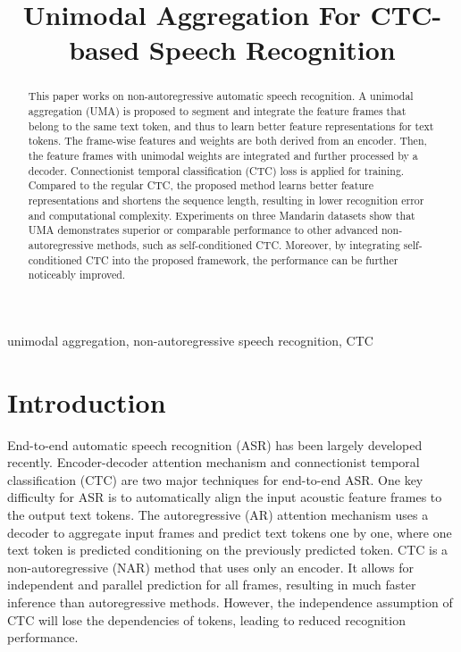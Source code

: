 \documentclass{article}
\title{Unimodal Aggregation For CTC-based Speech Recognition}
\begin{document}
\maketitle
\begin{abstract}
This paper works on non-autoregressive automatic speech recognition. A unimodal aggregation (UMA) is proposed to segment and integrate the feature frames that belong to the same text token, and thus to learn better feature representations for text tokens. The frame-wise features and weights are both derived from an encoder. Then, the feature frames with unimodal weights are integrated and further processed by a decoder. Connectionist temporal classification (CTC) loss is applied for training. Compared to the regular CTC, the proposed method learns better feature representations and shortens the sequence length, resulting in lower recognition error and computational complexity. Experiments on three Mandarin datasets show that UMA demonstrates superior or comparable performance to other advanced non-autoregressive methods, such as self-conditioned CTC. Moreover, by integrating self-conditioned CTC into the proposed framework, the performance can be further noticeably improved. 
\end{abstract}
\begin{keywords}
unimodal aggregation, non-autoregressive speech recognition, CTC 
\end{keywords}


\section{Introduction}
\label{sec:intro}
End-to-end automatic speech recognition (ASR) has been largely developed recently.  Encoder-decoder attention mechanism \cite{chan2016listen} and connectionist temporal classification (CTC) \cite{graves2014towards} are two major techniques for end-to-end ASR. One key difficulty for ASR is to automatically align the input acoustic feature frames to the output text tokens. The autoregressive (AR) attention mechanism uses a decoder to aggregate input frames and predict text tokens one by one, where one text token is predicted conditioning on the previously predicted token. 
CTC is a non-autoregressive (NAR) method that uses only an encoder. It allows for independent and parallel prediction for all frames, resulting in much faster inference than autoregressive methods. However, the independence assumption of CTC will lose the dependencies of tokens, leading to reduced recognition performance. 
\end{document}

